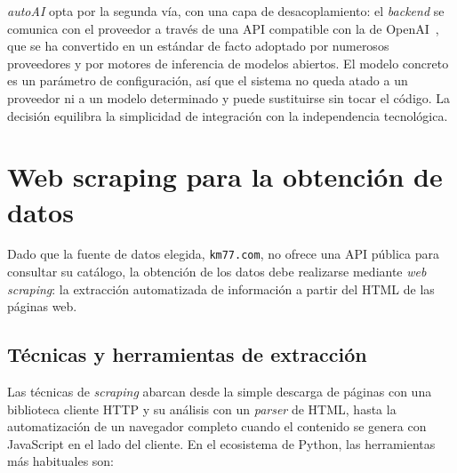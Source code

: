 \emph{autoAI} opta por la segunda vía, con una capa de desacoplamiento: el
\emph{backend} se comunica con el proveedor a través de una API compatible con la
de OpenAI~\cite{openai2024api}, que se ha convertido en un estándar de facto adoptado por numerosos
proveedores y por motores de inferencia de modelos abiertos. El modelo concreto es
un parámetro de configuración, así que el sistema no queda atado a un proveedor ni
a un modelo determinado y puede sustituirse sin tocar el código. La decisión
equilibra la simplicidad de integración con la independencia tecnológica.


\section{Web scraping para la obtención de datos}
\label{sec:arte-scraping}

Dado que la fuente de datos elegida, \texttt{km77.com}, no ofrece una API pública
para consultar su catálogo, la obtención de los datos debe realizarse mediante
\emph{web scraping}: la extracción automatizada de información a partir del HTML
de las páginas web.

\subsection{Técnicas y herramientas de extracción}

Las técnicas de \emph{scraping} abarcan desde la simple descarga de páginas con
una biblioteca cliente HTTP y su análisis con un \emph{parser} de HTML, hasta la
automatización de un navegador completo cuando el contenido se genera con
JavaScript en el lado del cliente. En el ecosistema de Python, las herramientas
más habituales son:

